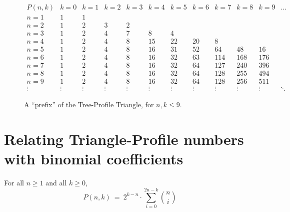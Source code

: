 \begin{figure}[htb]
\[
\begin{array}{c||r|r|r|r|r|r|r|r|r|r|r}
P(n, k) & k=0 & k=1 & k=2 & k=3 & k=4 & k=5 & k=6 & k=7 & k=8 & k=9 & \ldots \\
\hline
\hline
n=1 &  1 &  1 &    &    &     &     &     &     &     &     \\
\hline
n=2 &  1 &  2 &  3 &  2 &     &     &     &     &     &     \\
\hline
n=3 &  1 &  2 &  4 &  7 &   8 &   4 &     &     &     &     \\
\hline
n=4 &  1 &  2 &  4 &  8 &  15 &  22 &  20 &   8 &     &     \\
\hline
n=5 &  1 &  2 &  4 &  8 &  16 &  31 &  52 &  64 & 48  &  16 \\
\hline
n=6 &  1 &  2 &  4 &  8 &  16 &  32 &  63 & 114 & 168 & 176 \\
\hline
n=7 &  1 &  2 &  4 &  8 &  16 &  32 &  64 & 127 & 240 & 396 \\
\hline
n=8 &  1 &  2 &  4 &  8 &  16 &  32 &  64 & 128 & 255 & 494 \\
\hline
n=9 &  1 &  2 &  4 &  8 &  16 &  32 &  64 & 128 & 256 & 511 \\
\hline
\vdots &\vdots &\vdots &\vdots &\vdots &\vdots &\vdots &\vdots &\vdots
&\vdots &\vdots &\ddots
\end{array}
\] 
\caption{A ``prefix'' of the Tree-Profile Triangle, for $n,k \leq 9$.}
\label{fig:TP-triangle}
\end{figure}


\section{Relating Triangle-Profile numbers with binomial coefficients}

\begin{prop}
\label{thm:TP=sum-of-bincoeff}
For all $n \geq 1$ and all $k \geq 0$,
\begin{equation}
\label{eq:TP=sum-of-bincoeff}
P(n,k) \ = \ 2^{k-n} \cdot \sum_{i=0}^{2n-k} {n \choose i}
\end{equation}
\end{prop}

